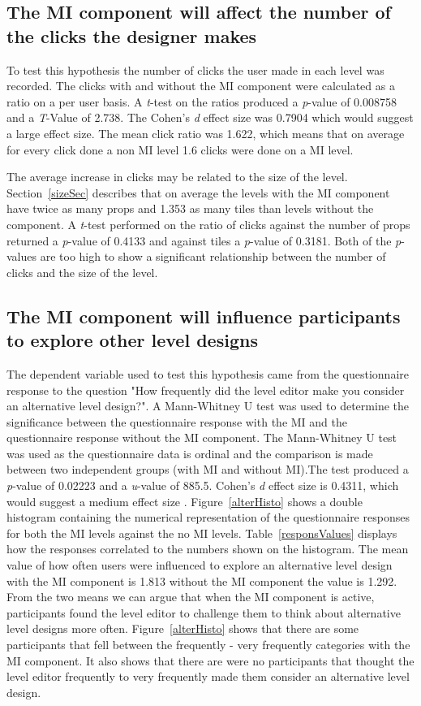 \documentclass[journal]{IEEEtran}
\begin{document}
\subsection{The MI component will affect the number of the clicks the designer makes}
To test this hypothesis the number of clicks the user made in each level was recorded. The clicks with and without the MI component were calculated as a ratio on a per user basis. A \textit{t}-test on the ratios produced a \textit{p}-value of 0.008758 and a \textit{T}-Value of 2.738. The Cohen's \textit{d} effect size was 0.7904 which would suggest a large effect size\cite{cohen1988statistical}. The mean click ratio was 1.622, which means that on average for every click done a non MI level 1.6 clicks were done on a MI level. 

The average increase in clicks may be related to the size of the level. Section~\ref{sizeSec} describes that on average the levels with the MI component  have twice as many props and 1.353 as many tiles than levels without the component. A \textit{t}-test performed on the ratio of clicks against the number of props returned a \textit{p}-value of 0.4133 and against tiles a \textit{p}-value of 0.3181. Both of the \textit{p}-values are too high to show a significant relationship between the number of clicks and the size of the level.

\subsection{The MI component will influence participants to explore other level designs}\label{alter}
The dependent variable used to test this hypothesis came from the questionnaire response to the question "How frequently did the level editor make you consider an alternative level design?". A Mann-Whitney U \cite{mann1947test} test was used to determine the significance between the questionnaire response with the MI and the questionnaire response without the MI component. The Mann-Whitney U test was used as the questionnaire data is ordinal and the comparison is made between two independent groups (with MI and without MI).The test produced a \textit{p}-value of 0.02223 and a \textit{u}-value of 885.5. Cohen's \textit{d} effect size is 0.4311, which would suggest a medium effect size \cite{cohen1988statistical}. Figure~\ref{alterHisto} shows a double histogram containing the numerical representation of the questionnaire responses for both the MI levels against the no MI levels. Table~\ref{responsValues} displays how the responses correlated to the numbers shown on the histogram. The mean value of how often users were influenced to explore an alternative level design with the MI component is 1.813 without the MI component the value is 1.292. From the two means we can argue that when the MI component is active, participants found the level editor to challenge them to think about alternative level designs more often. Figure~\ref{alterHisto} shows that there are some participants that fell between the frequently - very frequently categories with the MI component. It also shows that there are were no participants that thought the level editor frequently to very frequently made them consider an alternative level design.  
\end{document}
